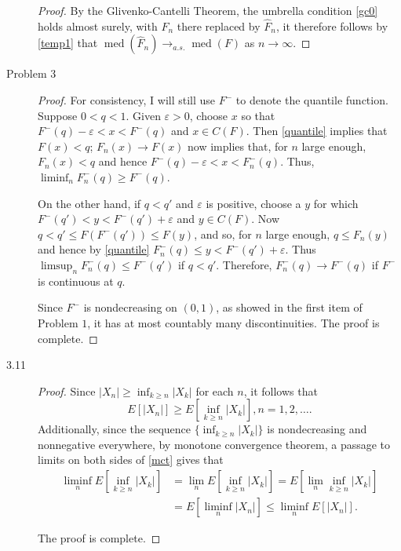 \documentclass{article}
\newcommand{\eps}{\varepsilon}
\DeclareMathOperator*{\med}{med}
\theoremstyle{definition}
\theoremstyle{plain}
\theoremstyle{remark}
\begin{document}
\begin{description}
\begin{proof}
By the Glivenko-Cantelli Theorem, the umbrella condition 
\eqref{gc0} holds almost surely, with $F_n$ there replaced by $\hat{F}_n$, it therefore follows
by \eqref{temp1} that $\med(\hat{F}_n) \to_{a.s.} \med(F)$ as $n \to \infty$.
\end{proof}

\item[Problem 3]
\begin{proof}
For consistency, I will still use $F^-$ to denote the quantile function. Suppose $0 < q < 1$. Given 
$\eps > 0$, choose $x$ so that $F^-(q) - \eps < x < F^-(q)$ and $x \in C(F)$. Then \eqref{quantile} implies that $F(x) < q$; $F_n(x) \to F(x)$ now implies that, for $n$ large enough, $F_n(x) < q$ and hence $F^-(q) - \eps < x < F_n^-(q)$. Thus, $\liminf_n F_n^-(q) \geq F^-(q)$. 

On the other hand, if $q < q'$ and $\eps$ is positive, choose a $y$ for which $F^-(q') < y < F^-(q') + \eps$ and $y \in C(F)$. Now $q < q' \leq F(F^-(q')) \leq F(y)$, and so, for $n$ large enough, $q \leq F_n(y)$ and hence by \eqref{quantile} $F_n^-(q)
 \leq y < F^-(q') + \eps$. Thus $\limsup_n F_n^-(q) \leq F^-(q')$ if $q < q'$. Therefore, $F_n^-(q) \to F^-(q)$ if $F^-$ is continuous at $q$.

Since $F^-$ is nondecreasing on $(0, 1)$, as showed in the first item of Problem 
$1$, it has at most countably many discontinuities. The proof is complete.
\end{proof}

\item[3.11]
\begin{proof}
Since $|X_n| \geq \inf_{k \geq n}|X_k|$ for each $n$, it follows that 
\begin{equation}\label{mct}
E[|X_n|] \geq E\left[\inf_{k \geq n} |X_k|\right], n = 1, 2, \ldots.
\end{equation}
Additionally, since the sequence $\{\inf_{k \geq n}|X_k|\}$ is nondecreasing and nonnegative everywhere, by monotone convergence theorem, a passage to limits on both sides of \eqref{mct} gives that
\begin{align*}
    \liminf_n E\left[\inf_{k \geq n} |X_k|\right] & = \lim_n E\left[\inf_{k \geq n} |X_k|\right] 
    = E\left[\lim_n \inf_{k \geq n} |X_k|\right] \\
    & = E\left[\liminf_n |X_n|\right] \leq \liminf_n E\left[|X_n|\right].
\end{align*}

The proof is complete.
\end{proof}


\end{description}
\end{document}
